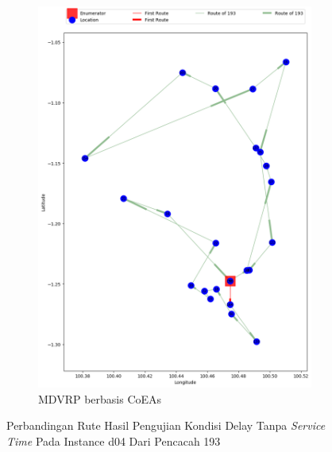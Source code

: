 \begin{figure}[H]
	\centering
	\begin{subfigure}[t]{\textwidth}
		\centering
		\includegraphics[width=\textwidth]{Resources/Images/delayed_5/real_m15_n100_delayed_5_193_coes}
		\caption{MDVRP berbasis CoEAs}
		\label{fig:real_m15_n100_delayed_5_193_coes}
	\end{subfigure}
	\caption{Perbandingan Rute Hasil Pengujian Kondisi Delay Tanpa \textit{Service Time} Pada Instance d04 Dari Pencacah 193}
	\label{fig:real_m15_n100_delayed_5_193}
\end{figure}


